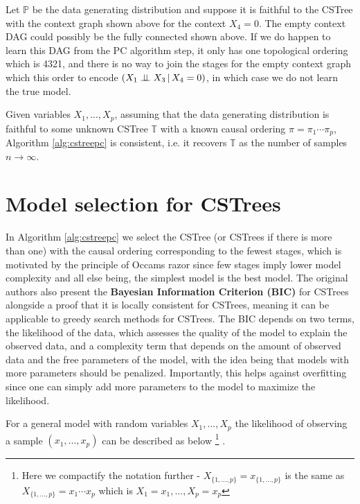 \documentclass{tufte-book}
\begin{document}
Let \(\mathbb{P}\) be the data generating distribution and suppose it is faithful to the CSTree with the context graph shown above for the context \(X_4=0\). The empty context DAG could possibly be the fully connected shown above. If we do happen to learn this DAG from the PC algorithm step, it only has one topological ordering which is 4321, and there is no way to join the stages for the empty context graph which this order to encode \((X_1 \perp \!\!\! \perp X_3 \,|\,X_4=0)\), in which case we do not learn the true model.


\begin{theorem}\label{thm:cstreepccorrectness}
Given variables $X_1,...,X_p$, assuming that the data generating distribution is faithful to some unknown CSTree $\mathbb{T}$ with a known causal ordering $\pi = \pi_1 \cdots \pi_p$, Algorithm \ref{alg:cstreepc} is consistent, i.e. it recovers $\mathbb{T}$ as the number of samples $n \rightarrow \infty$.
\end{theorem}


\section{Model selection for CSTrees}
\label{sec:org87a71d6}
In Algorithm \ref{alg:cstreepc} we select the CSTree (or CSTrees if there is more than one) with the causal ordering corresponding to the fewest stages, which is motivated by the principle of Occams razor since few stages imply lower model complexity and all else being, the simplest model is the best model. The original authors also present the \textbf{Bayesian Information Criterion (BIC)} for CSTrees alongside a proof that it is locally consistent for CSTrees, meaning it can be applicable to greedy search methods for CSTrees. The BIC depends on two terms, the likelihood of the data, which assesses the quality of the model to explain the observed data, and a complexity term that depends on the amount of observed data and the free parameters of the model, with the idea being that models with more parameters should be penalized. Importantly, this helps against overfitting since one can simply add more parameters to the model to maximize the likelihood.


For a general model with random variables \(X_1,...,X_p\) the likelihood of observing a sample \((x_1,...,x_p)\) can be described as below  \footnote{Here we compactify the notation further - $X_{\{1,...,p\}}=x_{\{1,...,p\}}$ is the same as $X_{\{1,...,p\}}=x_1\cdots x_p$ which is $X_1=x_1,...,X_p=x_p$} 
.
\end{document}
